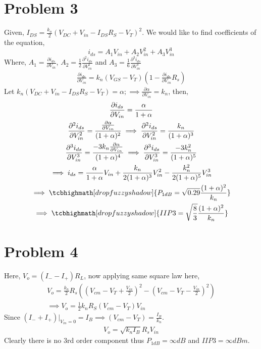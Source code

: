 \documentclass{article}
\begin{document}
\section*{\hfil Problem 3}
Given, $I_{DS} = \frac{k_n}{2}(V_{DC} + V_{in} - I_{DS}R_S - V_T)^2$. We would like to find coefficients of the equation,
\begin{equation*}
	i_{ds} = A_1V_{in} + A_2V_{in}^2 + A_3V_{in}^3
\end{equation*}
Where, $A_1 = \frac{\partial i_{ds}}{\partial V_{in}}$, $A_2 = \frac{1}{2}\frac{{\partial}^2 i_{ds}}{\partial V_{in}^2}$ and $A_3 = \frac{1}{6}\frac{{\partial}^3 i_{ds}}{\partial V_{in}^3}$
\begin{gather*}
	\frac{\partial i_{ds}}{\partial V_{in}} = k_n(V_{GS} - V_T)\left(1 - \frac{\partial i_{ds}}{\partial V_{in}}R_s\right)
\end{gather*}
Let $k_n(V_{DC} + V_{in} - I_{DS}R_S - V_T) = \alpha; \implies \frac{\partial \alpha}{\partial V_{in}} = k_n$, then,
\begin{gather*}
	\frac{\partial i_{ds}}{\partial V_{in}} = \frac{\alpha}{1 + \alpha}\\
	\frac{{\partial}^2 i_{ds}}{\partial V_{in}^2} = \frac{\frac{\partial \alpha}{\partial V_{in}}}{(1+\alpha)^2}
	\implies \frac{{\partial}^2 i_{ds}}{\partial V_{in}^2} = \frac{k_n}{(1+\alpha)^3}\\
	\frac{{\partial}^3 i_{ds}}{\partial V_{in}^3} = \frac{-3k_n\frac{\partial \alpha}{\partial V_{in}}}{(1+\alpha)^4}
	\implies \frac{{\partial}^3 i_{ds}}{\partial V_{in}^3} = \frac{-3k_n^2}{(1+\alpha)^5}\\
	\implies i_{ds} = \frac{\alpha}{1 + \alpha} V_{in} + \frac{k_n}{2(1+\alpha)^3}V_{in}^2 - \frac{k_n^2}{2(1+\alpha)^5}V_{in}^3\\
	\implies \tcbhighmath[drop fuzzy shadow]{P_{1dB} = \sqrt{0.29}\frac{(1+\alpha)^2}{k_n}}\\
	\implies \tcbhighmath[drop fuzzy shadow]{IIP3 = \sqrt{\frac{8}{3}}\frac{(1+\alpha)^2}{k_n}}
\end{gather*}
\section*{\hfil Problem 4}
Here, $V_o = (I_{-} - I_{+})R_L$, now applying same square law here,
\begin{gather*}
	V_o = \frac{k_n}{2}R_s((V_{cm} - V_T + \frac{V_{in}}{2})^2 - (V_{cm} - V_T - \frac{V_{in}}{2})^2)\\
	\implies V_o = \frac{1}{2}k_nR_S(V_{cm} - V_T)V_{in}
\end{gather*}
Since $(I_{-} + I_{+})|_{V_{in} = 0} = I_B \implies (V_{cm} - V_T) = \frac{I_B}{k_n}$.
\begin{gather*}
	V_o = \sqrt{k_nI_B}R_sV_{in}
\end{gather*}
Clearly there is no 3rd order component thus $P_{1dB} = \infty dB$ and $IIP3 = \infty dBm$.
\end{document}
